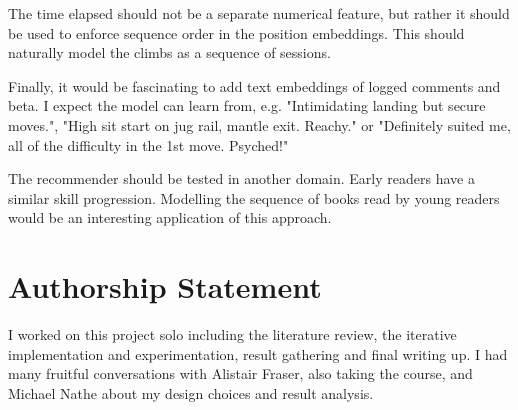 \documentclass[10pt]{article}
\begin{document}
The time elapsed should not be a separate numerical feature, but rather it should be used to enforce sequence order in the position embeddings. This should naturally model the climbs as a sequence of sessions. 

Finally, it would be fascinating to add text embeddings of logged comments and beta. I expect the model can learn from, e.g. "Intimidating landing but secure moves.", "High sit start on jug rail, mantle exit. Reachy." or "Definitely suited me, all of the difficulty in the 1st move. Psyched!"

The recommender should be tested in another domain. Early readers have a similar skill progression. Modelling the sequence of books read by young readers would be an interesting application of this approach.


\section*{Authorship Statement}

I worked on this project solo including the literature review, the iterative implementation and experimentation, result gathering and final writing up. I had many fruitful conversations with Alistair Fraser, also taking the course, and Michael Nathe about my design choices and result analysis. 





\end{document}
